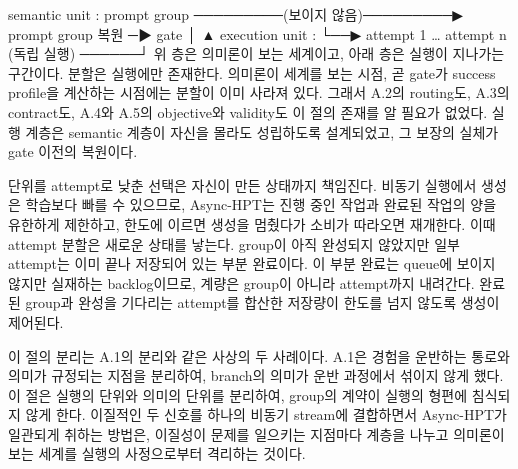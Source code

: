 semantic unit   :  prompt group  ─────────(보이지 않음)─────────▶  prompt group 복원  ─▶  gate
                        │                                              ▲
execution unit  :       └──▶  attempt 1 … attempt n  (독립 실행)  ──────┘
위 층은 의미론이 보는 세계이고, 아래 층은 실행이 지나가는 구간이다. 분할은 실행에만 존재한다. 의미론이 세계를 보는 시점, 곧 gate가 success profile을 계산하는 시점에는 분할이 이미 사라져 있다. 그래서 A.2의 routing도, A.3의 contract도, A.4와 A.5의 objective와 validity도 이 절의 존재를 알 필요가 없었다. 실행 계층은 semantic 계층이 자신을 몰라도 성립하도록 설계되었고, 그 보장의 실체가 gate 이전의 복원이다.

단위를 attempt로 낮춘 선택은 자신이 만든 상태까지 책임진다. 비동기 실행에서 생성은 학습보다 빠를 수 있으므로, Async-HPT는 진행 중인 작업과 완료된 작업의 양을 유한하게 제한하고, 한도에 이르면 생성을 멈췄다가 소비가 따라오면 재개한다. 이때 attempt 분할은 새로운 상태를 낳는다. group이 아직 완성되지 않았지만 일부 attempt는 이미 끝나 저장되어 있는 부분 완료이다. 이 부분 완료는 queue에 보이지 않지만 실재하는 backlog이므로, 계량은 group이 아니라 attempt까지 내려간다. 완료된 group과 완성을 기다리는 attempt를 합산한 저장량이 한도를 넘지 않도록 생성이 제어된다.

이 절의 분리는 A.1의 분리와 같은 사상의 두 사례이다. A.1은 경험을 운반하는 통로와 의미가 규정되는 지점을 분리하여, branch의 의미가 운반 과정에서 섞이지 않게 했다. 이 절은 실행의 단위와 의미의 단위를 분리하여, group의 계약이 실행의 형편에 침식되지 않게 한다. 이질적인 두 신호를 하나의 비동기 stream에 결합하면서 Async-HPT가 일관되게 취하는 방법은, 이질성이 문제를 일으키는 지점마다 계층을 나누고 의미론이 보는 세계를 실행의 사정으로부터 격리하는 것이다.
